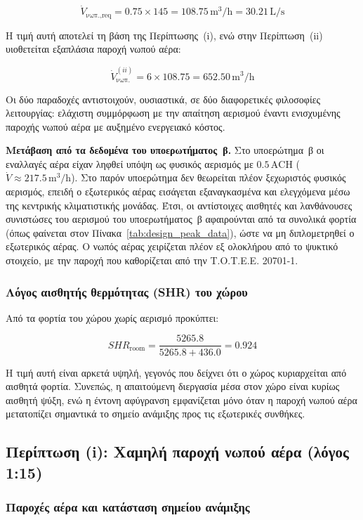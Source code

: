 \documentclass[12pt,a4paper]{article}
\begin{document}
\[
\dot V_{\text{νωπ.,req}}
= 0.75 \times 145
= 108.75\,\mathrm{m^3/h}
= 30.21\,\mathrm{L/s}
\]

Η τιμή αυτή αποτελεί τη βάση της Περίπτωσης~(i), ενώ στην Περίπτωση~(ii)
υιοθετείται εξαπλάσια παροχή νωπού αέρα:

\[
\dot V_{\text{νωπ.}}^{(ii)} = 6 \times 108.75 = 652.50\,\mathrm{m^3/h}
\]

Οι δύο παραδοχές αντιστοιχούν, ουσιαστικά, σε δύο διαφορετικές φιλοσοφίες
λειτουργίας: ελάχιστη συμμόρφωση με την απαίτηση αερισμού έναντι ενισχυμένης
παροχής νωπού αέρα με αυξημένο ενεργειακό κόστος.

\medskip
\noindent\textbf{Μετάβαση από τα δεδομένα του υποερωτήματος~β.} Στο υποερώτημα~β
οι εναλλαγές αέρα είχαν ληφθεί υπόψη ως φυσικός αερισμός με
\(0.5\,\mathrm{ACH}\) (\(\dot V \approx 217.5\,\mathrm{m^3/h}\)). Στο παρόν
υποερώτημα δεν θεωρείται πλέον ξεχωριστός φυσικός αερισμός, επειδή ο εξωτερικός
αέρας εισάγεται εξαναγκασμένα και ελεγχόμενα μέσω της κεντρικής κλιματιστικής
μονάδας. Έτσι, οι αντίστοιχες αισθητές και λανθάνουσες συνιστώσες του αερισμού του
υποερωτήματος~β αφαιρούνται από τα συνολικά φορτία (όπως φαίνεται στον
Πίνακα~\ref{tab:design_peak_data}), ώστε να μη διπλομετρηθεί ο εξωτερικός αέρας.
Ο νωπός αέρας χειρίζεται πλέον εξ ολοκλήρου από το ψυκτικό στοιχείο, με την παροχή
που καθορίζεται από την Τ.Ο.Τ.Ε.Ε. 20701-1.

\subsubsection{Λόγος αισθητής θερμότητας (SHR) του χώρου}

Από τα φορτία του χώρου χωρίς αερισμό προκύπτει:

\[
SHR_{\text{room}}
= \frac{5265.8}{5265.8 + 436.0}
= 0.924
\]

Η τιμή αυτή είναι αρκετά υψηλή, γεγονός που δείχνει ότι ο χώρος κυριαρχείται από
αισθητά φορτία. Συνεπώς, η απαιτούμενη διεργασία μέσα στον χώρο είναι κυρίως
αισθητή ψύξη, ενώ η έντονη αφύγρανση εμφανίζεται μόνο όταν η παροχή νωπού αέρα
μετατοπίζει σημαντικά το σημείο ανάμιξης προς τις εξωτερικές συνθήκες.

\subsection{Περίπτωση (i): Χαμηλή παροχή νωπού αέρα (λόγος 1:15)}

\subsubsection{Παροχές αέρα και κατάσταση σημείου ανάμιξης}
\end{document}
